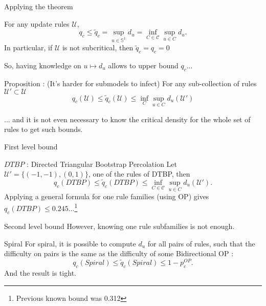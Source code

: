 \begin{frame}{Applying the theorem}
	\begin{theorem}
		For any update rules $\mathcal{U}$,
		\begin{equation*}
			q_c \leq \tilde q_c = \sup_{u\in\mathbb{S}^1} d_u = \inf_{C\in\mathcal{C}} \sup_{u\in C} d_u.
		\end{equation*}
		In particular, if $\mathcal{U}$ is not subcritical, then $\tilde q_c = q_c = 0$ 
	\end{theorem}
	So, having knowledge on $u\mapsto d_u$ allows to upper bound $q_c$...
	\begin{block}{Proposition : (It's harder for submodels to infect)}
		For any sub-collection of rules $\mathcal{U}'\subset \mathcal{U}$
		\begin{equation*}
			q_c(\mathcal{U}) \leq \tilde q_c (\mathcal{U}) \leq \inf_C \sup_{u\in C} d_u(\mathcal{U'})
		\end{equation*}
	\end{block}
	... and it is not even necessary to know the critical density for the whole set of rules to get such bounds.
\end{frame}

\begin{frame}{First level bound}
	\begin{block}{$DTBP$ : Directed Triangular Bootstrap Percolation}
		Let $\mathcal{U}' = \{(-1, -1), (0,1)\}$, one of the rules of DTBP, then
		\begin{equation*}
			q_c(DTBP) \leq \tilde q_c(DTBP) \leq \inf_{C\in\mathcal{C}} \sup_{u\in C} d_u(\mathcal{U}').
		\end{equation*}
		Applying a general formula for one rule families (using OP) gives $q_c(DTBP) \leq 0.245...$\footnote{Previous known bound was 0.312}
	\end{block}
\end{frame}

\begin{frame}{Second level bound}
	However, knowing one rule subfamilies is not enough.
	\begin{block}{Spiral}
		For spiral, it is possible to compute $d_u$ for all pairs of rules, such that the difficulty on pairs is the same as the difficulty of some Bidirectional OP :
		\begin{equation*}
			q_c(Spiral) \leq \tilde q_c(Spiral) \leq 1 - p_c^{OP}.
		\end{equation*}
		And the result is tight.
	\end{block}

\end{frame}
